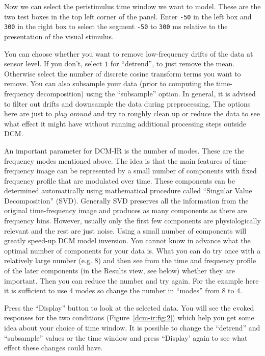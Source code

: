 Now we can select the peristimulus time window we want to model. These are the two test boxes in the top left corner of the panel. Enter \texttt{-50} in the left box and \texttt{300} in the right box to select the segment \texttt{-50} to \texttt{300} ms relative to the presentation of the visual stimulus.  

You can choose whether you want to remove low-frequency drifts of the data at sensor level. If you don't, select \texttt{1} for ``detrend'', to just remove the mean. Otherwise select the number of discrete cosine transform terms you want to remove. You can also subsample your data (prior to computing the time-frequency decomposition) using the ``subsample'' option. In general, it is advised to filter out drifts and downsample the data during preprocessing. The options here are just to \textit{play around} and try to roughly clean up or reduce the data to see what effect it might have without running additional processing steps outside DCM.

An important parameter for DCM-IR is the number of modes. These are the frequency modes mentioned above. The idea is that the main features of time-frequency image can be represented by a small number of components with fixed frequency profile that are modulated over time. These components can be determined automatically using mathematical procedure called ``Singular Value Decomposition'' (SVD). Generally SVD preserves all the information from the original time-frequency image and produces as many components as there are frequency bins. However, usually only the first few components are physiologically relevant and the rest are just noise. Using a small number of components will greatly speed-up DCM model inversion. You cannot know in advance what the optimal number of components for your data is. What you can do try once with a relatively large number (e.g. 8) and then see from the time and frequency profile of the later components (in the Results view, see below) whether they are important. Then you can reduce the number and try again. For the example here it is sufficient to use 4 modes so change the number in ``modes'' from 8 to 4. 

Press the ``Display'' button to look at the selected data. You will see the evoked responses for the two conditions (Figure~\ref{dcm-ir:fig:2}) which help you get some idea about your choice of time window. It is possible to change the ``detrend'' and ``subsample'' values or the time window and press ``Display' again to see what effect these changes could have. 

